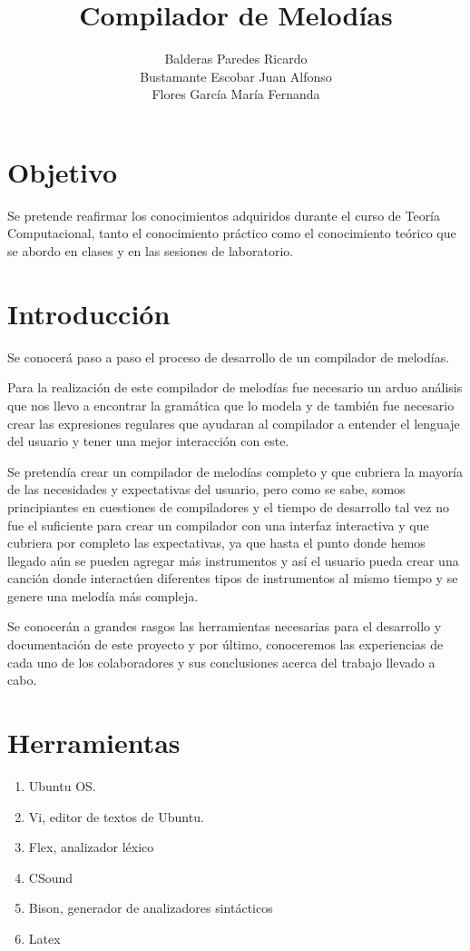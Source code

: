 \documentclass[12pt]{article}
\title{\textbf{Compilador de Melodías}}
\author{Balderas Paredes Ricardo\\
Bustamante Escobar Juan Alfonso\\
Flores García María Fernanda\\
  	}
\date{}
\begin{document}
\maketitle

\section{Objetivo}

Se pretende reafirmar los conocimientos adquiridos durante el curso de Teoría Computacional, tanto el conocimiento práctico como el conocimiento teórico que se abordo en clases y en las sesiones de laboratorio.

\section{Introducción}

Se conocerá paso a paso el proceso de desarrollo de un compilador de melodías. 

Para la realización de este compilador de melodías fue necesario un arduo análisis que nos llevo a encontrar la gramática que lo modela y de también fue necesario crear las expresiones regulares que ayudaran al compilador a entender el lenguaje del usuario y tener una mejor interacción con este. 

Se pretendía crear un compilador de melodías completo y que cubriera la mayoría de las necesidades y expectativas del usuario, pero como se sabe, somos principiantes en cuestiones de compiladores y el tiempo de desarrollo tal vez no fue el suficiente para crear un compilador con una interfaz interactiva y que cubriera por completo  las expectativas, ya que hasta el punto donde hemos llegado aún se pueden agregar más instrumentos y así el usuario pueda crear una canción donde interactúen diferentes tipos de instrumentos al mismo tiempo y se genere una melodía más compleja.

Se conocerán a grandes rasgos las herramientas necesarias para el desarrollo y documentación de este proyecto y por último, conoceremos las experiencias de cada uno de los colaboradores y sus conclusiones acerca del trabajo llevado a cabo.

\section{Herramientas}

\begin{enumerate}

\item Ubuntu OS.\\
\item Vi, editor de textos de Ubuntu.\\
\item Flex, analizador léxico\\
\item CSound\\
\item Bison, generador de analizadores sintácticos\\
\item Latex\\

\end{enumerate}
\end{document}
